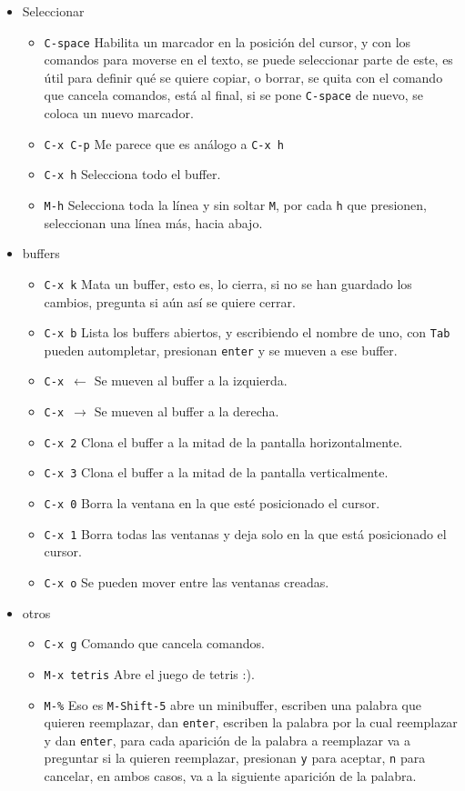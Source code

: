 \documentclass[spanish,12pt,letterpaper]{article}
\begin{document}
\begin{itemize}
\begin{itemize}
  \end{itemize}
\item Seleccionar
  \begin{itemize}
  \item \texttt{C-space} Habilita un marcador en la posición del cursor, y con
    los comandos para moverse en el texto, se puede seleccionar parte de este,
    es útil para definir qué se quiere copiar, o borrar, se quita con el comando
    que cancela comandos, está al final, si se pone \texttt{C-space} de nuevo,
    se coloca un nuevo marcador.
  \item \texttt{C-x C-p} Me parece que es análogo a \texttt{C-x h}
  \item \texttt{C-x h} Selecciona todo el buffer.
  \item \texttt{M-h} Selecciona toda la línea y sin soltar \texttt{M}, por cada
    \texttt{h} que presionen, seleccionan una línea más, hacia abajo. 
  \end{itemize}
\item buffers
  \begin{itemize}
  \item \texttt{C-x k} Mata un buffer, esto es, lo cierra, si no se han guardado
    los cambios, pregunta si aún así se quiere cerrar.
  \item \texttt{C-x b} Lista los buffers abiertos, y escribiendo el nombre de uno,
    con \texttt{Tab} pueden autompletar, presionan \texttt{enter} y se mueven a
    ese buffer.
  \item \texttt{C-x $\leftarrow$} Se mueven al buffer a la izquierda.
  \item \texttt{C-x $\rightarrow$} Se mueven al buffer a la derecha.
  \item \texttt{C-x 2} Clona el buffer a la mitad de la pantalla horizontalmente.
  \item \texttt{C-x 3} Clona el buffer a la mitad de la pantalla verticalmente.
  \item \texttt{C-x 0} Borra la ventana en la que esté posicionado el cursor.
  \item \texttt{C-x 1} Borra todas las ventanas y deja solo en la que está
    posicionado el cursor.
  \item \texttt{C-x o} Se pueden mover entre las ventanas creadas.
  \end{itemize}
\item otros
  \begin{itemize}
  \item \texttt{C-x g} Comando que cancela comandos.
  \item \texttt{M-x tetris} Abre el juego de tetris :).
  \item \texttt{M-\%} Eso es \texttt{M-Shift-5} abre un minibuffer, escriben una
    palabra que quieren reemplazar, dan \texttt{enter}, escriben la palabra por
    la cual reemplazar y dan \texttt{enter}, para cada aparición de la palabra a
    reemplazar va a preguntar si la quieren reemplazar, presionan \texttt{y}
    para aceptar, \texttt{n} para cancelar, en ambos casos, va a la siguiente
    aparición de la palabra.
  \end{itemize}
\end{itemize}
\end{document}

